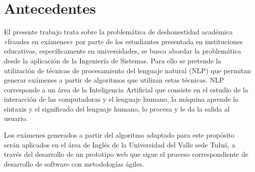 \documentclass[../Main.tex]{subfiles}
\begin{document}
\section{Antecedentes}
\begin{justify}
    El presente trabajo trata sobre la problemática de deshonestidad académica «fraudes en exámenes» por parte de los estudiantes presentada en instituciones educativas, específicamente en universidades, se busca abordar la problemática desde la aplicación de la Ingeniería de Sistemas. Para ello se pretende la utilización de técnicas de procesamiento del lenguaje natural (NLP) que permitan generar exámenes a partir de algoritmos que utilizan estas técnicas. NLP corresponde a un área de la Inteligencia Artificial que consiste en el estudio de la interacción de las computadoras y el lenguaje humano,  la máquina aprende la sintaxis y el significado del lenguaje humano, lo procesa y le da la salida al usuario.
\end{justify}

\begin{justify}
    Los exámenes generados a partir del algoritmo adaptado para este propósito serán aplicados en el área de Inglés de la Universidad del Valle sede Tuluá, a través del desarrollo de un prototipo web que sigue el proceso correspondiente de desarrollo de software con metodologías ágiles.
\end{justify}
\end{document}
